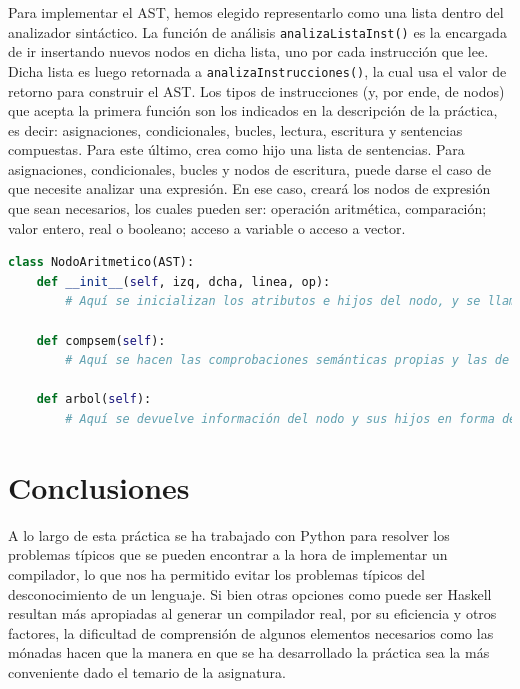 \documentclass[11pt]{article}
\begin{document}
Para implementar el AST, hemos elegido representarlo como una lista dentro del analizador sintáctico. La función de análisis \lstinline[language=Python]{analizaListaInst()} es la encargada de ir insertando nuevos nodos en dicha lista, uno por cada instrucción que lee. Dicha lista es luego retornada a \lstinline[language=Python]{analizaInstrucciones()}, la cual usa el valor de retorno para construir el AST. Los tipos de instrucciones (y, por ende, de nodos) que acepta la primera función son los indicados en la descripción de la práctica, es decir: asignaciones, condicionales, bucles, lectura, escritura y sentencias compuestas. Para este último, crea como hijo una lista de sentencias. Para asignaciones, condicionales, bucles y nodos de escritura, puede darse el caso de que necesite analizar una expresión. En ese caso, creará los nodos de expresión que sean necesarios, los cuales pueden ser: operación aritmética, comparación; valor entero, real o booleano; acceso a variable o acceso a vector.

\begin{minipage}{\linewidth}
    \begin{lstlisting}[language=Python, caption=NodoAritmetico(AST)]          
class NodoAritmetico(AST):
	def __init__(self, izq, dcha, linea, op):
		# Aquí se inicializan los atributos e hijos del nodo, y se llama a compsem()
	
	def compsem(self):
		# Aquí se hacen las comprobaciones semánticas propias y las de los hijos

	def arbol(self):
		# Aquí se devuelve información del nodo y sus hijos en forma de string
	\end{lstlisting}
\end{minipage}

\section{Conclusiones}
A lo largo de esta práctica se ha trabajado con Python para resolver los problemas típicos que se pueden encontrar a la hora de implementar un compilador, lo que nos ha permitido evitar los problemas típicos del desconocimiento de un lenguaje. Si bien otras opciones como puede ser Haskell resultan más apropiadas al generar un compilador real, por su eficiencia y otros factores, la dificultad de comprensión de algunos elementos necesarios como las mónadas hacen que la manera en que se ha desarrollado la práctica sea la más conveniente dado el temario de la asignatura. 
\end{document}
